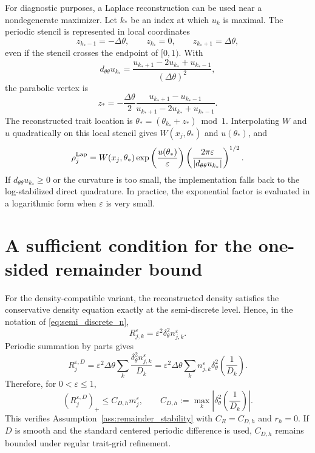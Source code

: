 \documentclass[11pt]{article}
\begin{document}
For diagnostic purposes, a Laplace reconstruction can be used near a nondegenerate maximizer. Let \(k_*\) be an index at which \(u_k\) is maximal. The periodic stencil is represented in local coordinates
\[
    z_{k_*-1}=-\Delta\theta,
    \qquad
    z_{k_*}=0,
    \qquad
    z_{k_*+1}=\Delta\theta,
\]
even if the stencil crosses the endpoint of \([0,1)\). With
\[
    d_{\theta\theta}u_{k_*}
    =\frac{u_{k_*+1}-2u_{k_*}+u_{k_*-1}}{(\Delta\theta)^2},
\]
the parabolic vertex is
\begin{equation}\label{eq:laplace_vertex_new}
    z_*=-\frac{\Delta\theta}{2}
    \frac{u_{k_*+1}-u_{k_*-1}}{u_{k_*+1}-2u_{k_*}+u_{k_*-1}}.
\end{equation}
The reconstructed trait location is \(\theta_*=(\theta_{k_*}+z_*)\bmod 1\). Interpolating \(W\) and \(u\) quadratically on this local stencil gives \(W(x_j,\theta_*)\) and \(u(\theta_*)\), and
\begin{equation}\label{eq:laplace_rho_new}
    \rho_j^{\rm Lap}
    =W(x_j,\theta_*)\exp\left(\frac{u(\theta_*)}{\varepsilon}\right)
    \left(\frac{2\pi\varepsilon}{|d_{\theta\theta}u_{k_*}|}\right)^{1/2}.
\end{equation}
If \(d_{\theta\theta}u_{k_*}\ge0\) or the curvature is too small, the implementation falls back to the log-stabilized direct quadrature. In practice, the exponential factor is evaluated in a logarithmic form when \(\varepsilon\) is very small.

\section{A sufficient condition for the one-sided remainder bound}\label{app:remainder}

For the density-compatible variant, the reconstructed density satisfies the conservative density equation exactly at the semi-discrete level.  Hence, in the notation of \eqref{eq:semi_discrete_n},
\[
    R_{j,k}^{\varepsilon}=\varepsilon^2\delta_\theta^2 n_{j,k}^{\varepsilon}.
\]
Periodic summation by parts gives
\begin{equation}\label{eq:dc_remainder_sbp_new}
    R_j^{\varepsilon,D}
    =\varepsilon^2\Delta\theta\sum_k
    \frac{\delta_\theta^2 n_{j,k}^{\varepsilon}}{D_k}
    =\varepsilon^2\Delta\theta\sum_k
    n_{j,k}^{\varepsilon}\delta_\theta^2\left(\frac{1}{D_k}\right).
\end{equation}
Therefore, for \(0<\varepsilon\le1\),
\begin{equation}\label{eq:dc_remainder_bound_new}
    (R_j^{\varepsilon,D})_+
    \le
    C_{D,h}m_j^\varepsilon,
    \qquad
    C_{D,h}:=\max_k\left|\delta_\theta^2\left(\frac{1}{D_k}\right)\right|.
\end{equation}
This verifies Assumption~\ref{ass:remainder_stability} with \(C_R=C_{D,h}\) and \(r_h=0\).  If \(D\) is smooth and the standard centered periodic difference is used, \(C_{D,h}\) remains bounded under regular trait-grid refinement.
\end{document}

